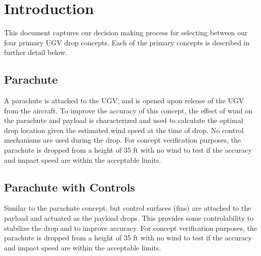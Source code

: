 \documentclass[]{auvsi_doc}
\begin{document}
\begin{AUVSITitlePage}
\begin{artifacttable}

\end{artifacttable}
\end{AUVSITitlePage}


\section{Introduction}
This document captures our decision making process for selecting between our four primary UGV drop concepts.
Each of the primary concepts is described in further detail below. 

\subsection{Parachute}
A parachute is attached to the UGV, and is opened upon release of the UGV from the aircraft. To improve the accuracy of this concept, the effect of wind on the parachute and payload is characterized and used to calculate the optimal drop location given the estimated wind speed at the time of drop. No control mechanisms are used during the drop. For concept verification purposes, the parachute is dropped from a height of 35 ft with no wind to test  if the accuracy and impact speed are within the acceptable limits.

\subsection{Parachute with Controls}
Similar to the parachute concept, but control surfaces (fins) are attached to the payload and actuated as the payload drops. This provides some controlability to stabilize the drop and to improve accuracy. For concept verification purposes, the parachute is dropped from a height of 35 ft with no wind to test  if the accuracy and impact speed are within the acceptable limits.
\end{document}
